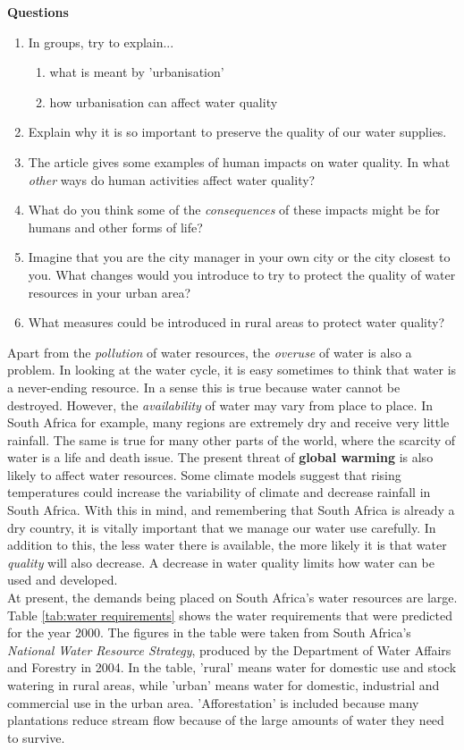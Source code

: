 {\textbf{Questions}

\begin{enumerate}
\item{In groups, try to explain...}
	\begin{enumerate}
	\item{what is meant by 'urbanisation'}
	\item{how urbanisation can affect water quality}
	\end{enumerate}
\item{Explain why it is so important to preserve the quality of our water supplies.}
\item{The article gives some examples of human impacts on water quality. In what \textit{other} ways do human activities affect water quality?}
\item{What do you think some of the \textit{consequences} of these impacts might be for humans and other forms of life?}
\item{Imagine that you are the city manager in your own city or the city closest to you. What changes would you introduce to try to protect the quality of water resources in your urban area?}
\item{What measures could be introduced in rural areas to protect water quality?}
\end{enumerate}
}

Apart from the \textit{pollution} of water resources, the \textit{overuse} of water is also a problem. In looking at the water cycle, it is easy sometimes to think that water is a never-ending resource. In a sense this is true because water cannot be destroyed. However, the \textit{availability} of water may vary from place to place. In South Africa for example, many regions are extremely dry and receive very little rainfall. The same is true for many other parts of the world, where the scarcity of water is a life and death issue. The present threat of \textbf{global warming} is also likely to affect water resources. Some climate models suggest that rising temperatures could increase the variability of climate and decrease rainfall in South Africa. With this in mind, and remembering that South Africa is already a dry country, it is vitally important that we manage our water use carefully. In addition to this, the less water there is available, the more likely it is that water \textit{quality} will also decrease. A decrease in water quality limits how water can be used and developed.\\

At present, the demands being placed on South Africa's water resources are large. Table \ref{tab:water requirements} shows the water requirements that were predicted for the year 2000. The figures in the table were taken from South Africa's \textit{National Water Resource Strategy}, produced by the Department of Water Affairs and Forestry in 2004. In the table, 'rural' means water for domestic use and stock watering in rural areas, while 'urban' means water for domestic, industrial and commercial use in the urban area. 'Afforestation' is included because many plantations reduce stream flow because of the large amounts of water they need to survive.

